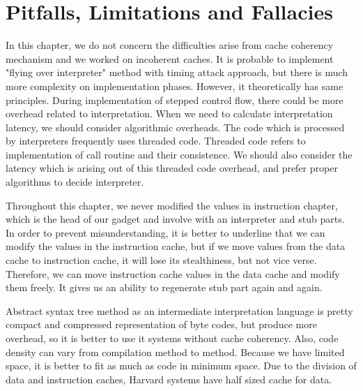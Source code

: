 \section{Pitfalls, Limitations and Fallacies}
	In this chapter, we do not concern the difficulties arise from cache coherency mechanism and we worked on incoherent caches. It is probable to implement "flying over interpreter" method with timing attack approach, but there is much more complexity on implementation phases. However, it theoretically has same principles. During implementation of stepped control flow, there could be more overhead related to interpretation. When we need to calculate interpretation latency, we should consider algorithmic overheads. The code which is processed by interpreters frequently uses threaded code. Threaded code refers to implementation of call routine and their consistence. We should also consider the latency which is arising out of this threaded code overhead, and prefer proper algorithms to decide interpreter. 

	Throughout this chapter, we never modified the values in instruction chapter, which is the head of our gadget and involve with an interpreter and stub parts. In order to prevent misunderstanding, it is better to underline that we can modify the values in the instruction cache, but if we move values from the data cache to instruction cache, it will lose its stealthiness, but not vice verse. Therefore, we can move instruction cache values in the data cache and modify them freely. It gives us an ability to regenerate stub part again and again.

	Abstract syntax tree method as an intermediate interpretation language is pretty compact and compressed representation of byte codes\cite{kistler1999tree}, but produce more overhead\cite{garen2008announcing}, so it is better to use it systems without cache coherency. Also, code density can vary from compilation method to method. Because we have limited space, it is better to fit as much as code in minimum space. Due to the division of data and instruction caches, Harvard systems have half sized cache for data.